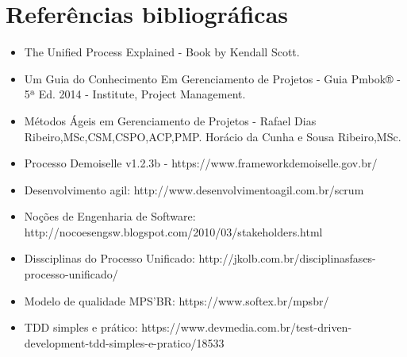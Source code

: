 \documentclass[	DIV=calc,%
							paper=a4,%
							fontsize=12pt,%
							onecolumn]{scrartcl}	 					%
\begin{document}
\section{Referências bibliográficas}
\renewcommand\refname{} %

\begin{itemize}

\item The Unified Process Explained - Book by Kendall Scott.
\item Um Guia do Conhecimento Em Gerenciamento de Projetos - Guia Pmbok® - 5ª Ed. 2014 - Institute, Project Management.
\item Métodos Ágeis em Gerenciamento de Projetos - Rafael Dias Ribeiro,MSc,CSM,CSPO,ACP,PMP. Horácio da Cunha e Sousa Ribeiro,MSc.
\item Processo Demoiselle v1.2.3b -	https://www.frameworkdemoiselle.gov.br/

\item Desenvolvimento agil: http://www.desenvolvimentoagil.com.br/scrum

\item Noções de Engenharia de Software: http://nocoesengsw.blogspot.com/2010/03/stakeholders.html

\item Dissciplinas do Processo Unificado: http://jkolb.com.br/disciplinasfases-processo-unificado/

\item Modelo de qualidade MPS'BR:
https://www.softex.br/mpsbr/

\item TDD simples e prático:   https://www.devmedia.com.br/test-driven-development-tdd-simples-e-pratico/18533


\end{itemize}
  

\end{document}
